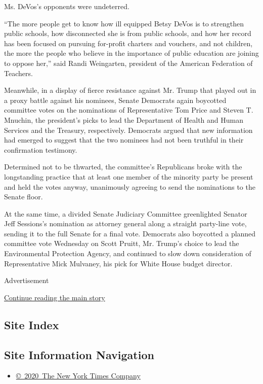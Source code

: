 Ms. DeVos's opponents were undeterred.

``The more people get to know how ill equipped Betsy DeVos is to
strengthen public schools, how disconnected she is from public schools,
and how her record has been focused on pursuing for-profit charters and
vouchers, and not children, the more the people who believe in the
importance of public education are joining to oppose her,'' said Randi
Weingarten, president of the American Federation of Teachers.

Meanwhile, in a display of fierce resistance against Mr. Trump that
played out in a proxy battle against his nominees, Senate Democrats
again boycotted committee votes on the nominations of Representative Tom
Price and Steven T. Mnuchin, the president's picks to lead the
Department of Health and Human Services and the Treasury, respectively.
Democrats argued that new information had emerged to suggest that the
two nominees had not been truthful in their confirmation testimony.

Determined not to be thwarted, the committee's Republicans broke with
the longstanding practice that at least one member of the minority party
be present and held the votes anyway, unanimously agreeing to send the
nominations to the Senate floor.

At the same time, a divided Senate Judiciary Committee greenlighted
Senator Jeff Sessions's nomination as attorney general along a straight
party-line vote, sending it to the full Senate for a final vote.
Democrats also boycotted a planned committee vote Wednesday on Scott
Pruitt, Mr. Trump's choice to lead the Environmental Protection Agency,
and continued to slow down consideration of Representative Mick
Mulvaney, his pick for White House budget director.

Advertisement

\protect\hyperlink{after-bottom}{Continue reading the main story}

\hypertarget{site-index}{%
\subsection{Site Index}\label{site-index}}

\hypertarget{site-information-navigation}{%
\subsection{Site Information
Navigation}\label{site-information-navigation}}

\begin{itemize}
\tightlist
\item
  \href{https://help.nytimes.com/hc/en-us/articles/115014792127-Copyright-notice}{©~2020~The
  New York Times Company}
\end{itemize}

